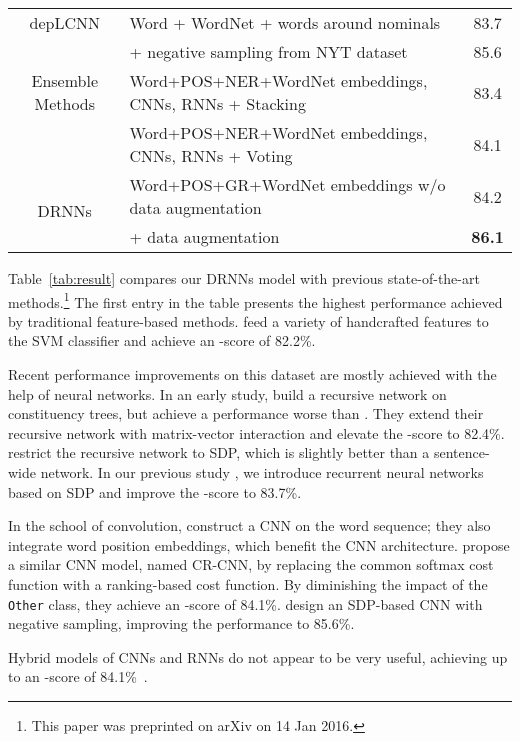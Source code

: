 \documentclass[11pt]{article}
\begin{document}
\begin{table*}[!t]
{\begin{tabular}{c|l|c}
\hline
depLCNN & Word + WordNet + words around nominals & 83.7\\
\footnotesize\cite{CNN-NG}     & + negative sampling from NYT dataset & 85.6\\
\hline
Ensemble Methods & Word+POS+NER+WordNet embeddings, CNNs, RNNs + Stacking &  83.4 \\
\footnotesize\cite{EnsembleNN}   & Word+POS+NER+WordNet embeddings, CNNs, RNNs + Voting   & 84.1\\
\hline
\multirow{2}{*}{DRNNs}          & Word+POS+GR+WordNet embeddings w/o data augmentation                                          & 84.2\\
    & + data augmentation      &\textbf{86.1}\\
\hline
\hline
\end{tabular}
}
\caption{Comparison of previous relation classification systems.}
\label{tab:result}
\end{table*}
Table~\ref{tab:result} compares our DRNNs model with previous state-of-the-art methods.\footnote{This paper was preprinted on arXiv on 14 Jan 2016.}
The first entry in the table presents the highest performance achieved by traditional feature-based methods.
 feed a variety of handcrafted features to the SVM classifier and achieve an -score of 82.2\%.


Recent performance improvements on this dataset are mostly achieved with the help of neural networks.
In an early study,  build a recursive network on constituency trees, but achieve a performance worse than .
They extend their recursive network with matrix-vector interaction and elevate the -score to 82.4\%.
 restrict the recursive network to SDP, which is slightly better than a sentence-wide network.
In our previous study \cite{SDP-LSTM}, we introduce recurrent neural networks based on SDP and improve the -score to 83.7\%.

In the school of convolution,  construct a CNN on the word sequence; they also integrate word position embeddings, which benefit the CNN architecture.
 propose a similar CNN model, named CR-CNN, by replacing the common softmax cost function with a ranking-based cost function.
By diminishing the impact of the \verb|Other| class, they achieve an -score of 84.1\%.
 design an SDP-based CNN with negative sampling, improving the performance to 85.6\%.

Hybrid models of CNNs and RNNs do not appear to be very useful, achieving up to an -score of 84.1\%~\cite{DepNN,EnsembleNN}.
\end{document}
